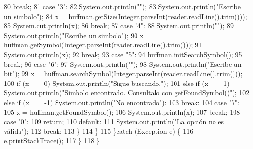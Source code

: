 \begin{DoxyCode}
80                 \textcolor{keywordflow}{break};
81                 \textcolor{keywordflow}{case} \textcolor{stringliteral}{"3"}:
82                     System.out.println(\textcolor{stringliteral}{""});
83                     System.out.println(\textcolor{stringliteral}{"Escribe un simbolo"});
84                     x = huffman.getSize(Integer.parseInt(reader.readLine().trim()));
85                     System.out.println(x);
86                 \textcolor{keywordflow}{break};
87                 \textcolor{keywordflow}{case} \textcolor{stringliteral}{"4"}:
88                     System.out.println(\textcolor{stringliteral}{""});
89                     System.out.println(\textcolor{stringliteral}{"Escribe un simbolo"});
90                     x = huffman.getSymbol(Integer.parseInt(reader.readLine().trim()));
91                     System.out.println(x);
92                 \textcolor{keywordflow}{break};
93                 \textcolor{keywordflow}{case} \textcolor{stringliteral}{"5"}:
94                     huffman.initSearchSymbol();
95                 \textcolor{keywordflow}{break};
96                 \textcolor{keywordflow}{case} \textcolor{stringliteral}{"6"}:
97                     System.out.println(\textcolor{stringliteral}{""});
98                     System.out.println(\textcolor{stringliteral}{"Escribe un bit"});
99                     x = huffman.searchSymbol(Integer.parseInt(reader.readLine().trim()));
100                     \textcolor{keywordflow}{if} (x == 0) System.out.println(\textcolor{stringliteral}{"Sigue buscando."});
101                     \textcolor{keywordflow}{else} \textcolor{keywordflow}{if} (x == 1) System.out.println(\textcolor{stringliteral}{"Simbolo encontrado. Consultalo con
       getFoundSymbol()"});
102                     \textcolor{keywordflow}{else} \textcolor{keywordflow}{if} (x == -1) System.out.println(\textcolor{stringliteral}{"No encontrado"});
103                 \textcolor{keywordflow}{break};
104                 \textcolor{keywordflow}{case} \textcolor{stringliteral}{"7"}:
105                     x = huffman.getFoundSymbol();
106                     System.out.println(x);
107                 \textcolor{keywordflow}{break};
108                 \textcolor{keywordflow}{case} \textcolor{stringliteral}{"0"}:
109                     \textcolor{keywordflow}{return};
110                 \textcolor{keywordflow}{default}:
111                     System.out.println(\textcolor{stringliteral}{"La opción no es válida"});
112                 \textcolor{keywordflow}{break};
113             \}
114         \}
115     \}\textcolor{keywordflow}{catch} (Exception e) \{
116         e.printStackTrace();
117     \}
118     \}
\end{DoxyCode}
\mbox{\label{classdomini_1_1algorithm_1_1Driver____Huffman_a0504e4a97aa7c7a0ad7c1a75187adb10}} 
